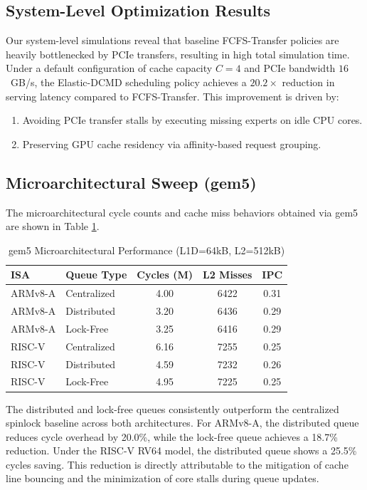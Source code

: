 \documentclass[conference]{IEEEtran}
\begin{document}
\subsection{System-Level Optimization Results}
Our system-level simulations reveal that baseline FCFS-Transfer policies are heavily bottlenecked by PCIe transfers, resulting in high total simulation time. Under a default configuration of cache capacity $C=4$ and PCIe bandwidth $16$~GB/s, the Elastic-DCMD scheduling policy achieves a $20.2\times$ reduction in serving latency compared to FCFS-Transfer. This improvement is driven by:
\begin{enumerate}
    \item Avoiding PCIe transfer stalls by executing missing experts on idle CPU cores.
    \item Preserving GPU cache residency via affinity-based request grouping.
\end{enumerate}

\subsection{Microarchitectural Sweep (gem5)}
The microarchitectural cycle counts and cache miss behaviors obtained via gem5 are shown in Table \ref{tab:microarch}.

\begin{table}[htbp]
\caption{gem5 Microarchitectural Performance (L1D=64kB, L2=512kB)}
\label{tab:microarch}
\centering
\begin{tabular}{@{}llccc@{}}
\toprule
\textbf{ISA} & \textbf{Queue Type} & \textbf{Cycles (M)} & \textbf{L2 Misses} & \textbf{IPC} \\ \midrule
ARMv8-A & Centralized & 4.00 & 6422 & 0.31 \\
ARMv8-A & Distributed & 3.20 & 6436 & 0.29 \\
ARMv8-A & Lock-Free    & 3.25 & 6416 & 0.29 \\ \midrule
RISC-V  & Centralized & 6.16 & 7255 & 0.25 \\
RISC-V  & Distributed & 4.59 & 7232 & 0.26 \\
RISC-V  & Lock-Free    & 4.95 & 7225 & 0.25 \\ \bottomrule
\end{tabular}
\end{table}

The distributed and lock-free queues consistently outperform the centralized spinlock baseline across both architectures. For ARMv8-A, the distributed queue reduces cycle overhead by 20.0\%, while the lock-free queue achieves a 18.7\% reduction. Under the RISC-V RV64 model, the distributed queue shows a 25.5\% cycles saving. This reduction is directly attributable to the mitigation of cache line bouncing and the minimization of core stalls during queue updates.
\end{document}
